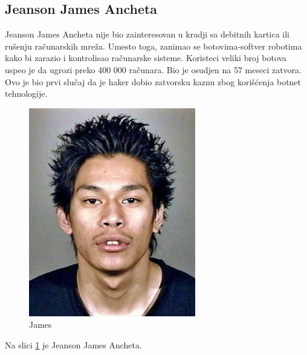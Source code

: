 \documentclass[a4paper]{article}
\begin{document}
\subsection{Jeanson James Ancheta}
Jeanson James Ancheta nije bio zainteresovan u kradji sa debitnih kartica ili rušenju računarskih mreža. Umesto toga, zanimao se botovima-softver robotima kako bi zarazio i kontrolisao računarske sisteme. Koristeci veliki broj botova uspeo je da ugrozi preko 400 000 računara. Bio je osudjen na 57 meseci zatvora. Ovo je bio prvi slučaj da je haker dobio zatvorsku kaznu zbog korišćenja botnet tehnologije.
\begin{figure}[h!]
	\begin{center}
		\includegraphics[scale=0.30]{james.jpg}
	\end{center}
	\caption{James}
	\label{fig:james}
\end{figure}

Na slici \ref{fig:james} je Jeanson James Ancheta.
\newpage
\end{document}
